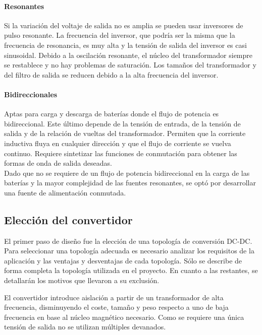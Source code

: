 \paragraph{Resonantes}
Si la variación del voltaje de salida no es amplia se pueden usar inversores de pulso resonante. 
La frecuencia del inversor, que podría ser la misma que la frecuencia de resonancia, es muy alta y la tensión de salida del inversor es casi sinusoidal.
Debido a la oscilación resonante, el núcleo del transformador siempre se restablece y no hay problemas de saturación. 
Los tamaños del transformador y del filtro de salida se reducen debido a la alta frecuencia del inversor.

\paragraph{Bidireccionales}
Aptas para carga y descarga de baterías donde el flujo de potencia es bidireccional.
Este último depende de la tensión de entrada, de la tensión de salida y de la relación de vueltas del transformador. 
Permiten que la corriente inductiva fluya en cualquier dirección y que el flujo de corriente se vuelva continuo.
Requiere sintetizar las funciones de conmutación para obtener las formas de onda de salida deseadas.\\

Dado que no se requiere de un flujo de potencia bidireccional en la carga de las baterías y la mayor complejidad de las fuentes resonantes, 
se optó por desarrollar una fuente de alimentación conmutada. 

\subsection{Elección del convertidor}

El primer paso de diseño fue la elección de una topología de conversión DC-DC.
Para seleccionar una topología adecuada es necesario analizar los requisitos de la aplicación y las ventajas y desventajas de cada topología.  
Sólo se describe de forma completa la topología utilizada en el proyecto. En cuanto a las restantes, se detallarán los motivos que llevaron a su exclusión.  

El convertidor introduce aislación a partir de un transformador de alta frecuencia,
disminuyendo el coste, tamaño y peso respecto a uno de baja frecuencia en base al núcleo magnético necesario.
Como se requiere una única tensión de salida no se utilizan múltiples devanados.

